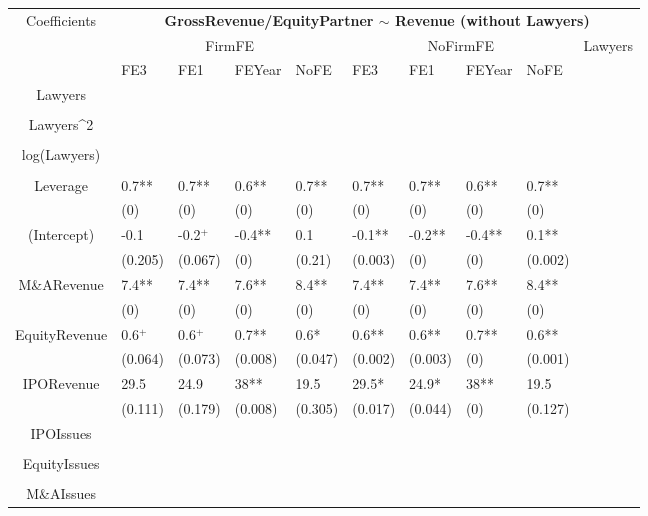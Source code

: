 \documentclass{article}
\begin{document}
\begin{table}[H]
\centering
\begin{tabular}{|clllllllll|}
\hline
\multirow{3}{*}{Coefficients} & \multicolumn{9}{c|}{\textbf{GrossRevenue/EquityPartner $\sim$ Revenue (without Lawyers)}} \\
\cline{2-10}
& \multicolumn{4}{c}{FirmFE} & \multicolumn{4}{c}{NoFirmFE} & \multirow{2}{*}{Lawyers} \\
\cline{2-9}
& FE3 & FE1 & FEYear & NoFE & FE3 & FE1 & FEYear & NoFE &  \\
\hline
 
Lawyers &  &  &  &  &  &  &  &  & \\ 
   &  &  &  &  &  &  &  &  & \\ 
  Lawyers^2 &  &  &  &  &  &  &  &  & \\ 
   &  &  &  &  &  &  &  &  & \\ 
  log(Lawyers) &  &  &  &  &  &  &  &  & \\ 
   &  &  &  &  &  &  &  &  & \\ 
  Leverage & 0.7** & 0.7** & 0.6** & 0.7** & 0.7** & 0.7** & 0.6** & 0.7** & \\ 
   & (0) & (0) & (0) & (0) & (0) & (0) & (0) & (0) & \\ 
  (Intercept) & -0.1 & -0.2$^{+}$ & -0.4** & 0.1 & -0.1** & -0.2** & -0.4** & 0.1** & \\ 
   & (0.205) & (0.067) & (0) & (0.21) & (0.003) & (0) & (0) & (0.002) & \\ 
  M\&ARevenue & 7.4** & 7.4** & 7.6** & 8.4** & 7.4** & 7.4** & 7.6** & 8.4** & \\ 
   & (0) & (0) & (0) & (0) & (0) & (0) & (0) & (0) & \\ 
  EquityRevenue & 0.6$^{+}$ & 0.6$^{+}$ & 0.7** & 0.6* & 0.6** & 0.6** & 0.7** & 0.6** & \\ 
   & (0.064) & (0.073) & (0.008) & (0.047) & (0.002) & (0.003) & (0) & (0.001) & \\ 
  IPORevenue & 29.5 & 24.9 & 38** & 19.5 & 29.5* & 24.9* & 38** & 19.5 & \\ 
   & (0.111) & (0.179) & (0.008) & (0.305) & (0.017) & (0.044) & (0) & (0.127) & \\ 
  IPOIssues &  &  &  &  &  &  &  &  & \\ 
   &  &  &  &  &  &  &  &  & \\ 
  EquityIssues &  &  &  &  &  &  &  &  & \\ 
   &  &  &  &  &  &  &  &  & \\ 
  M\&AIssues &  &  &  &  &  &  &  &  & \\ 

\end{tabular}
\end{table}
\end{document}
